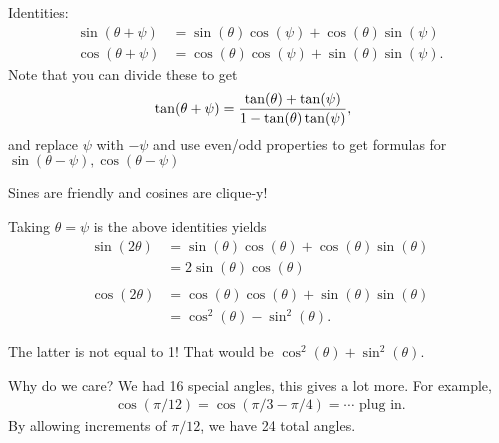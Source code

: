\begin{proposition}

Identities:
\begin{align*}
\sin(\theta + \psi) &= \sin(\theta) \cos(\psi) + \cos(\theta) \sin(\psi) \\
\cos(\theta + \psi) &= \cos(\theta) \cos(\psi) + \sin(\theta) \sin(\psi)
.\end{align*}
Note that you can divide these to get
\begin{align*}
\tan(\theta + \psi) &= {\tan(\theta) + \tan(\psi) \over 1 - \tan(\theta) \tan(\psi) }
,\end{align*}
and replace \(\psi\) with \(-\psi\) and use even/odd properties to get
formulas for \(\sin(\theta - \psi), \cos(\theta - \psi)\)

\end{proposition}

\begin{slogan}

Sines are friendly and cosines are clique-y!

\end{slogan}

\begin{corollary}

Taking \(\theta = \psi\) is the above identities yields
\begin{align*}
\sin(2\theta ) 
&= \sin(\theta) \cos(\theta) + \cos(\theta) \sin(\theta) \\
&= 2\sin(\theta)\cos(\theta) \\ \\
\cos(2\theta) 
&= \cos(\theta) \cos(\theta) + \sin(\theta) \sin(\theta) \\
&= \cos^2(\theta) - \sin^2(\theta) 
.\end{align*}

\end{corollary}

\begin{warnings}

The latter is not equal to 1! That would be
\(\cos^2(\theta) + \sin^2(\theta)\).

\end{warnings}

\begin{remark}

Why do we care? We had 16 special angles, this gives a lot more. For
example,
\begin{align*}
\cos(\pi/12)
=
\cos(\pi/3 - \pi/4) = \cdots \text{ plug in}
.\end{align*}
By allowing increments of \(\pi/12\), we have 24 total angles.

\end{remark}

